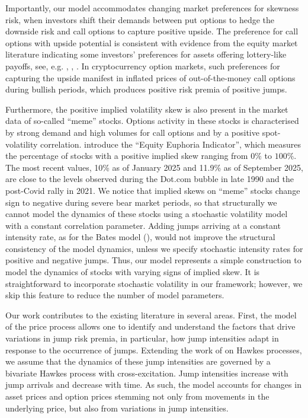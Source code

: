 \documentclass[11pt,a4paper]{article}
\numberwithin{equation}{section}
\theoremstyle{remark}
\theoremstyle{definition}
\begin{document}
Importantly, our model accommodates changing market preferences for skewness risk, when investors shift their demands between put options to hedge the downside risk and call options to capture positive upside. The preference for call options with upside potential is consistent with evidence from the equity market literature indicating some investors' preferences for assets offering lottery-like payoffs, see, e.g. \cite{bali2011maxing}, \cite{thaler1988anomalies}, \cite{kumar2009gambles}. In cryptocurrency option markets, such preferences for capturing the upside manifest in inflated prices of out-of-the-money call options during bullish periods, which produces positive risk premia of positive jumps.

Furthermore, the positive implied volatility skew is also present in the market data of so-called ``meme'' stocks.
Options activity in these stocks is characterised by strong demand and high volumes for call options and by a positive spot-volatility correlation.
\cite{gupta2025} introduce the ``Equity Euphoria Indicator'', which measures the percentage of stocks with a positive implied skew ranging from $0\%$ to $100\%$.
The most recent values, 10\% as of January 2025 and 11.9\% as of September 2025, are close to the levels observed during the Dot.com bubble in late 1990 and the post-Covid rally in 2021.
We notice that implied skews on ``meme'' stocks change sign to negative during severe bear market periods, so that structurally we cannot model the dynamics of these stocks using a stochastic volatility model with a constant correlation parameter.
Adding jumps arriving at a constant intensity rate, as for the Bates model (\cite{bates1996jumps}), would not improve the structural consistency of the model dynamics, unless we specify stochastic intensity rates for positive and negative jumps.
Thus, our model represents a simple construction to model the dynamics of stocks with varying signs of implied skew.
It is straightforward to incorporate stochastic volatility in our framework; however, we skip this feature to reduce the number of model parameters.

Our work contributes to the existing literature in several areas.
First, the model of the price process allows one to identify and understand the factors that drive variations in jump risk premia, in particular, how jump intensities adapt in response to the occurrence of jumps.
Extending the work of  on Hawkes processes, we assume that the dynamics of these jump intensities are governed by a bivariate Hawkes process with cross-excitation.
Jump intensities increase with jump arrivals and decrease with time.
As such, the model accounts for changes in asset prices and option prices stemming not only from movements in the underlying price, but also from variations in jump intensities.
\end{document}
